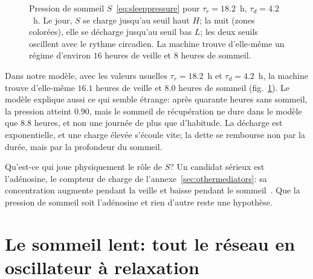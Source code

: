 \begin{figure}[t]
\centering
{}
\caption{Pression de sommeil $S$~\eqref{eq:sleeppressure} pour $\tau_r=18.2$~h, $\tau_d=4.2$~h. Le jour, $S$ se charge jusqu'au seuil haut $H$; la nuit (zones colorées), elle se décharge jusqu'au seuil bas $L$; les deux seuils oscillent avec le rythme circadien. La machine trouve d'elle-même un régime d'environ $16$ heures de veille et $8$ heures de sommeil.}
\label{fig:twoprocess}
\end{figure}

Dans notre modèle, avec les valeurs usuelles $\tau_r=18.2$~h et $\tau_d=4.2$~h, la machine trouve d'elle-même $16.1$ heures de veille et $8.0$ heures de sommeil (fig.~\ref{fig:twoprocess}). Le modèle explique aussi ce qui semble étrange: après quarante heures sans sommeil, la pression atteint $0.90$, mais le sommeil de récupération ne dure dans le modèle que $8.8$ heures, et non une journée de plus que d'habitude. La décharge est exponentielle, et une charge élevée s'écoule vite; la \og dette\fg{} se rembourse non par la durée, mais par la profondeur du sommeil.

Qu'est-ce qui joue physiquement le rôle de $S$? Un candidat sérieux est l'adénosine, le \og compteur de charge\fg{} de l'annexe~\ref{sec:othermediators}: sa concentration augmente pendant la veille et baisse pendant le sommeil~\cite{PorkkaHeiskanen1997,Dunwiddie2001}. Que la pression de sommeil soit l'adénosine et rien d'autre reste une hypothèse.

\section{Le sommeil lent: tout le réseau en oscillateur à relaxation}

